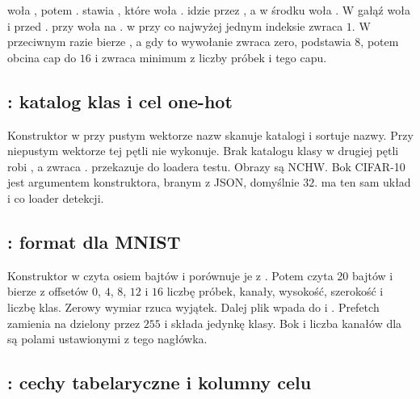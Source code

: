  woła , potem .  stawia , które woła .  idzie przez , a w środku woła . W  gałąź  woła  i  przed .  przy  woła  na .  w  przy co najwyżej jednym indeksie zwraca \(1\). W przeciwnym razie bierze , a gdy to wywołanie zwraca zero, podstawia \(8\), potem obcina cap do \(16\) i zwraca minimum z liczby próbek i tego capu.

\subsection{: katalog klas i cel one-hot}

Konstruktor w  przy pustym wektorze nazw skanuje katalogi  i sortuje nazwy. Przy niepustym wektorze tej pętli nie wykonuje. Brak katalogu klasy w drugiej pętli robi , a  zwraca .  przekazuje  do loadera testu. Obrazy są NCHW. Bok CIFAR-10 jest argumentem konstruktora, branym z JSON, domyślnie \(32\).  ma ten sam układ  i  co loader detekcji.

\subsection{: format  dla MNIST}

Konstruktor w  czyta osiem bajtów i porównuje je z . Potem czyta 20 bajtów i  bierze z offsetów \(0\), \(4\), \(8\), \(12\) i \(16\) liczbę próbek, kanały, wysokość, szerokość i liczbę klas. Zerowy wymiar rzuca wyjątek. Dalej plik wpada do  i . Prefetch zamienia  na  dzielony przez \(255\) i składa jedynkę klasy. Bok i liczba kanałów dla  są polami ustawionymi z tego nagłówka.

\subsection{: cechy tabelaryczne i kolumny celu}

